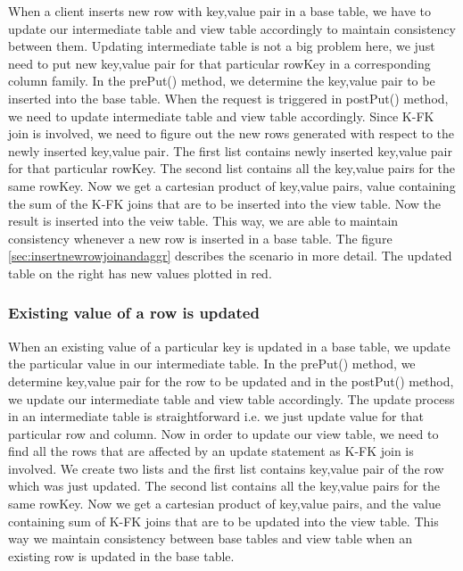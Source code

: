 \documentclass[11pt,a4paper,bibtotoc,idxtotoc,headsepline,footsepline,footexclude,BCOR12mm,DIV13]{scrbook}
\begin{document}
When a client inserts new row with key,value pair in a base table, we have to update our intermediate table and view table accordingly to maintain consistency between them. Updating intermediate table is not a big problem here, we just need to put new key,value pair for that particular rowKey in a corresponding column family. In the prePut() method, we determine the key,value pair to be inserted into the base table. When the request is triggered in postPut() method, we need to update intermediate table and view table accordingly. Since K-FK join is involved, we need to figure out the new rows generated with respect to the newly inserted key,value pair. The first list contains newly inserted key,value pair for that particular rowKey. The second list contains all the key,value pairs for the same rowKey. Now we get a cartesian product of key,value pairs, value containing the sum of the K-FK joins that are to be inserted into the view table. Now the result is inserted into the veiw table. This way, we are able to maintain consistency whenever a new row is inserted in a base table.
The figure \ref{sec:insertnewrowjoinandaggr} describes the scenario in more detail. The updated table on the right has new values plotted in red.

\subsubsection{Existing value of a row is updated}

When an existing value of a particular key is updated in a base table, we update the particular value in our intermediate table. In the prePut() method, we determine key,value pair for the row to be updated and in the postPut() method, we update our intermediate table and view table accordingly. The update process in an intermediate table is straightforward i.e. we just update value for that particular row and column. Now in order to update our view table, we need to find all the rows that are affected by an update statement as K-FK join is involved. We create two lists and the first list contains key,value pair of the row which was just updated. The second list contains all the key,value pairs for the same rowKey. Now we get a cartesian product of key,value pairs, and the value containing sum of K-FK joins that are to be updated into the view table. This way we maintain consistency between base tables and view table when an existing row is updated in the base table.
\end{document}
